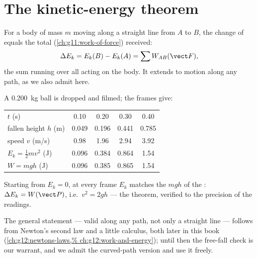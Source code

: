 \section{The kinetic-energy theorem}

\begin{theorem}\label{thm:g11:mechanical-energy:ketheorem}
For a body of mass $m$ moving along a straight line from $A$ to $B$,
the change of  equals the total 
(\cref{ch:g11:work-of-force}) received:
\[
\Delta E_k = E_k(B) - E_k(A) = \sum W_{AB}(\vect F),
\]
the sum running over all  acting on the body. It extends to
motion along any path, as we also admit here.
\end{theorem}
\admitted

\begin{example}\label{ex:g11:mechanical-energy:freefall}
A \qty{0.200}{kg} ball is dropped and filmed; the frames give:
\begin{center}\small
\begin{tabular}{lcccc}
$t$ (\unit{s}) & 0.10 & 0.20 & 0.30 & 0.40\\
fallen height $h$ (\unit{m}) & 0.049 & 0.196 & 0.441 & 0.785\\
speed $v$ (\unit{m/s}) & 0.98 & 1.96 & 2.94 & 3.92\\
$E_k = \tfrac12 mv^2$ (\unit{J}) & 0.096 & 0.384 & 0.864 & 1.54\\
$W = mgh$ (\unit{J}) & 0.096 & 0.385 & 0.865 & 1.54
\end{tabular}
\end{center}
Starting from $E_k = 0$, at every frame $E_k$ matches the  $mgh$ of
the : $\Delta E_k = W(\vect P)$, i.e.\ $v^2 = 2gh$ --- the theorem,
verified to the precision of the readings.
\end{example}

\begin{remark}\label{rem:g11:mechanical-energy:proof}
The general statement --- valid along any path, not only a straight
line --- follows from Newton's second law and a little calculus, both
later in this book (\cref{ch:g12:newtons-laws,%
ch:g12:work-and-energy}); until then the free-fall check is our
warrant, and we admit the curved-path version and use it freely.
\end{remark}


